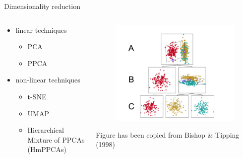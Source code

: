 \documentclass{beamer}
\begin{document}
\begin{frame}{Dimensionality reduction}
\begin{columns}
\begin{column}{0.5\textwidth}
    \begin{itemize}
    \item linear techniques
    \begin{itemize}
        \item PCA
        \item PPCA
        \end{itemize}
        \item non-linear techniques
        \begin{itemize}
        \item t-SNE
        \item UMAP
        \item Hierarchical Mixture of PPCAs (HmPPCAs)
        \end{itemize}
    \end{itemize}
\end{column}
\begin{column}{0.5\textwidth}
\begin{figure}
    \centering
    \includegraphics[width=\linewidth]{hierarchy_bishoptipping.png}
\end{figure}
\footnotesize
Figure has been copied from Bishop \& Tipping (1998) \cite{bishop1998hierarchical}
\end{column}
\end{columns}
\end{frame}
\end{document}
